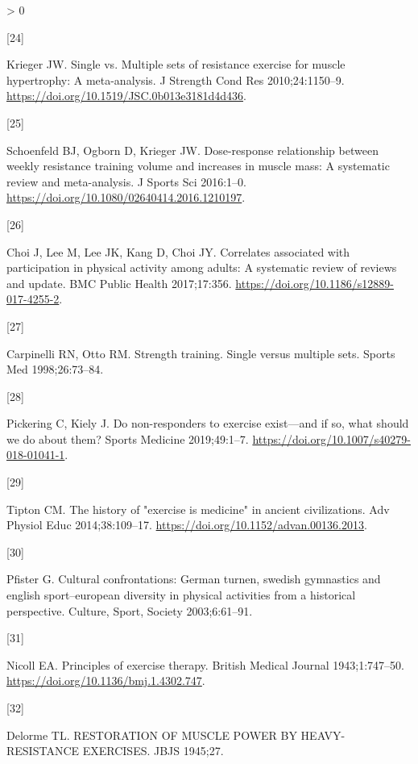 \documentclass[twoside,10pt]{gihclass} %
\newlength{\cslhangindent}
\newlength{\csllabelwidth}
\newenvironment{CSLReferences}[3] %
 {%
  \setlength{\parindent}{0pt}
  \ifodd #1 \everypar{\setlength{\hangindent}{\cslhangindent}}\ignorespaces\fi
  \ifnum #2 > 0
  \setlength{\parskip}{#2\baselineskip}
  \fi
 }%
 {}
\newcommand{\CSLLeftMargin}[1]{\parbox[t]{\maxof{\widthof{#1}}{\csllabelwidth}}{#1}}
\newcommand{\CSLRightInline}[1]{\parbox[t]{\linewidth}{#1}}
\begin{document}
\begin{CSLReferences}{0}{0}
\leavevmode\hypertarget{ref-RN789}{}%
\CSLLeftMargin{{[}24{]} }
\CSLRightInline{Krieger JW. Single vs. Multiple sets of resistance exercise for muscle hypertrophy: A meta-analysis. J Strength Cond Res 2010;24:1150--9. \url{https://doi.org/10.1519/JSC.0b013e3181d4d436}.}

\leavevmode\hypertarget{ref-RN1767}{}%
\CSLLeftMargin{{[}25{]} }
\CSLRightInline{Schoenfeld BJ, Ogborn D, Krieger JW. Dose-response relationship between weekly resistance training volume and increases in muscle mass: A systematic review and meta-analysis. J Sports Sci 2016:1--0. \url{https://doi.org/10.1080/02640414.2016.1210197}.}

\leavevmode\hypertarget{ref-RN2063}{}%
\CSLLeftMargin{{[}26{]} }
\CSLRightInline{Choi J, Lee M, Lee JK, Kang D, Choi JY. Correlates associated with participation in physical activity among adults: A systematic review of reviews and update. BMC Public Health 2017;17:356. \url{https://doi.org/10.1186/s12889-017-4255-2}.}

\leavevmode\hypertarget{ref-RN794}{}%
\CSLLeftMargin{{[}27{]} }
\CSLRightInline{Carpinelli RN, Otto RM. Strength training. Single versus multiple sets. Sports Med 1998;26:73--84.}

\leavevmode\hypertarget{ref-RN2547}{}%
\CSLLeftMargin{{[}28{]} }
\CSLRightInline{Pickering C, Kiely J. Do non-responders to exercise exist---and if so, what should we do about them? Sports Medicine 2019;49:1--7. \url{https://doi.org/10.1007/s40279-018-01041-1}.}

\leavevmode\hypertarget{ref-RN2640}{}%
\CSLLeftMargin{{[}29{]} }
\CSLRightInline{Tipton CM. The history of "exercise is medicine" in ancient civilizations. Adv Physiol Educ 2014;38:109--17. \url{https://doi.org/10.1152/advan.00136.2013}.}

\leavevmode\hypertarget{ref-RN2663}{}%
\CSLLeftMargin{{[}30{]} }
\CSLRightInline{Pfister G. Cultural confrontations: German turnen, swedish gymnastics and english sport--european diversity in physical activities from a historical perspective. Culture, Sport, Society 2003;6:61--91.}

\leavevmode\hypertarget{ref-RN2634}{}%
\CSLLeftMargin{{[}31{]} }
\CSLRightInline{Nicoll EA. Principles of exercise therapy. British Medical Journal 1943;1:747--50. \url{https://doi.org/10.1136/bmj.1.4302.747}.}

\leavevmode\hypertarget{ref-RN2633}{}%
\CSLLeftMargin{{[}32{]} }
\CSLRightInline{Delorme TL. RESTORATION OF MUSCLE POWER BY HEAVY-RESISTANCE EXERCISES. JBJS 1945;27.}


\end{CSLReferences}
\end{document}
